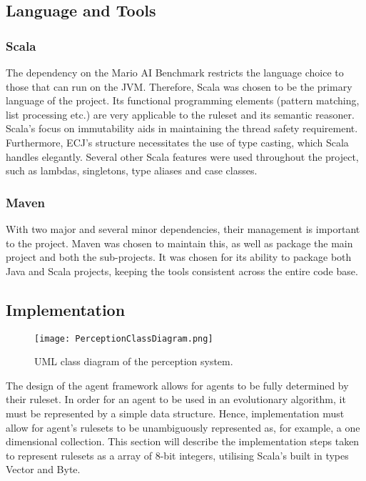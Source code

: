 \subsection{Language and Tools}

\subsubsection{Scala}
\label{subsec:langchoice}
The dependency on the Mario AI Benchmark restricts the language choice to those that can run on the JVM. Therefore, Scala was chosen to be the primary language of the project. Its functional programming elements (pattern matching, list processing etc.) are very applicable to the ruleset and its semantic reasoner. Scala's focus on immutability aids in maintaining the thread safety requirement. Furthermore, ECJ's structure necessitates the use of type casting, which Scala handles elegantly. Several other Scala features were used throughout the project, such as lambdas, singletons, type aliases and case classes. 

\subsubsection{Maven}
With two major and several minor dependencies, their management is important to the project. Maven was chosen to maintain this, as well as package the main project and both the sub-projects. It was chosen for its ability to package both Java and Scala projects, keeping the tools consistent across the entire code base.



\subsection{Implementation}

\begin{figure}[t]
	\centering
	\texttt{[image: PerceptionClassDiagram.png]}
	\caption{UML class diagram of the perception system.}
	\label{fig:percumlcd}
\end{figure}

The design of the agent framework allows for agents to be fully determined by their ruleset. In order for an agent to be used in an evolutionary algorithm, it must be represented by a simple data structure. Hence, implementation must allow for agent's rulesets to be unambiguously represented as, for example, a one dimensional collection. This section will describe the implementation steps taken to represent rulesets as a array of 8-bit integers, utilising Scala's built in types Vector and Byte.

